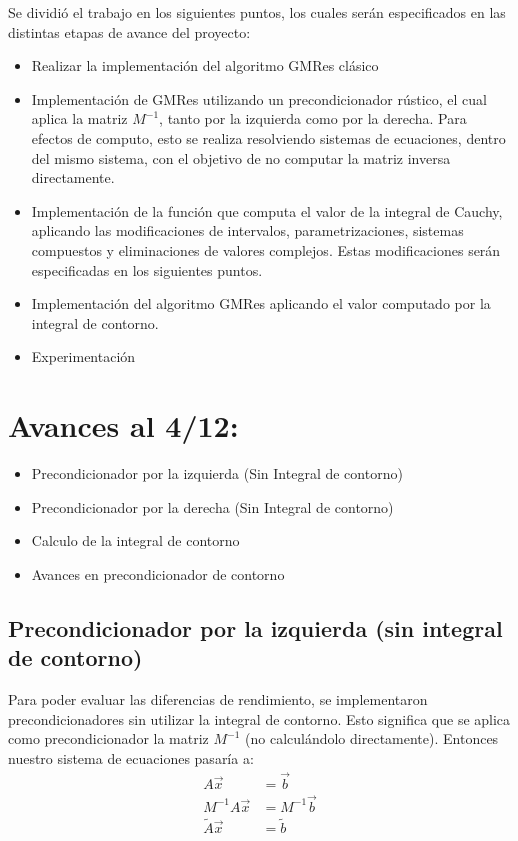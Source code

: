 \documentclass[fleqn]{article}
\begin{document}
Se dividió el trabajo en los siguientes puntos, los cuales serán especificados en las distintas etapas de avance del proyecto:
\begin{itemize}
    \item Realizar la implementación del algoritmo GMRes clásico
    
    \item Implementación de GMRes utilizando un precondicionador rústico, el cual aplica la matriz $M^{-1}$, tanto por la izquierda como por la derecha. 
    Para efectos de computo, esto se realiza resolviendo sistemas de ecuaciones, dentro del mismo sistema, con el objetivo de no computar la matriz inversa directamente.
    
    \item Implementación de la función que computa el valor de la integral de Cauchy, aplicando las modificaciones de intervalos, parametrizaciones, sistemas compuestos y eliminaciones de valores complejos. Estas modificaciones serán especificadas en los siguientes puntos.
    
    \item Implementación del algoritmo GMRes aplicando el valor computado por la integral de contorno.
    
    \item Experimentación 
    
\end{itemize}

\newpage
\section{Avances al 4/12:}

\begin{itemize}
\item Precondicionador por la izquierda (Sin Integral de contorno)
\item Precondicionador por la derecha (Sin Integral de contorno) 
\item Calculo de la integral de contorno 
\item Avances en precondicionador de contorno
\end{itemize}

\subsection{Precondicionador por la izquierda (sin integral de contorno)}
Para poder evaluar las diferencias de rendimiento, se implementaron precondicionadores sin utilizar la integral de contorno. Esto significa que se aplica como precondicionador la matriz $M^{-1}$ (no calculándolo directamente). Entonces nuestro sistema de ecuaciones pasaría a:
\begin{align*}
    A\vec{x} &= \vec{b} \\
    M^{-1}A\vec{x} &= M^{-1}\vec{b} \\
    \widetilde{A}\vec{x} &= \widetilde{b}
\end{align*}
\end{document}
